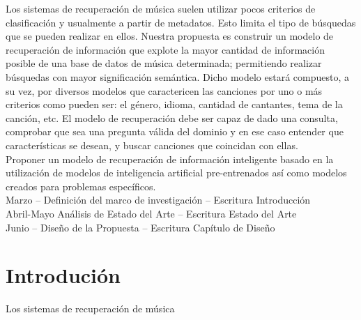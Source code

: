 \documentclass[11pt,a4paper,oldfontcommands]{memoir}
\begin{document}
\clearpage
\begin{multicols}{2}
Los sistemas de recuperación de música suelen utilizar pocos criterios de clasificación y usualmente a partir de metadatos. Esto limita el tipo de búsquedas que se pueden realizar en ellos. Nuestra propuesta es construir un modelo de recuperación de información que explote la mayor cantidad de información posible de una base de datos de música determinada; permitiendo realizar búsquedas con mayor significación semántica. Dicho modelo estará compuesto, a su vez, por diversos modelos que caractericen las canciones por uno o más criterios como pueden ser: el género, idioma, cantidad de cantantes, tema de la canción, etc. El modelo de recuperación debe ser capaz de dado una consulta, comprobar que sea una pregunta válida del dominio y en ese caso entender que características se desean, y buscar canciones que coincidan con ellas.
\\[1em]
Proponer un modelo de recuperación de información inteligente basado en la utilización de modelos de inteligencia artificial pre-entrenados así como modelos creados para problemas específicos. 
\\[1em]
Marzo –  Definición del marco de investigación – Escritura Introducción \\
Abril-Mayo  Análisis de Estado del Arte – Escritura Estado del Arte \\
Junio  –  Diseño de la Propuesta – Escritura Capítulo de Diseño \\


\section{Introdución}
Los sistemas de recuperación de música


\end{multicols}
\end{document}
